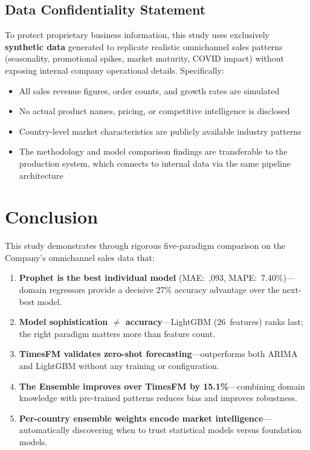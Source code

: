 \documentclass[10pt,twocolumn,a4paper]{article}
\begin{document}
\subsection{Data Confidentiality Statement}

To protect proprietary business information, this study uses exclusively \textbf{synthetic data} generated to replicate realistic omnichannel sales patterns (seasonality, promotional spikes, market maturity, COVID impact) without exposing internal company operational details. Specifically:
\begin{itemize}[leftmargin=*,noitemsep,topsep=2pt]
    \item All sales revenue figures, order counts, and growth rates are simulated
    \item No actual product names, pricing, or competitive intelligence is disclosed
    \item Country-level market characteristics are publicly available industry patterns
    \item The methodology and model comparison findings are transferable to the production system, which connects to internal data via the same pipeline architecture
\end{itemize}

\section{Conclusion}
\label{sec:conclusion}

This study demonstrates through rigorous five-paradigm comparison on the Company's omnichannel sales data that:

\begin{enumerate}[leftmargin=*,noitemsep,topsep=2pt]
    \item \textbf{Prophet is the best individual model} (MAE:~,093, MAPE:~7.40\%)---domain regressors provide a decisive 27\% accuracy advantage over the next-best model.
    \item \textbf{Model sophistication $\neq$ accuracy}---LightGBM (26~features) ranks last; the right paradigm matters more than feature count.
    \item \textbf{TimesFM validates zero-shot forecasting}---outperforms both ARIMA and LightGBM without any training or configuration.
    \item \textbf{The Ensemble improves over TimesFM by 15.1\%}---combining domain knowledge with pre-trained patterns reduces bias and improves robustness.
    \item \textbf{Per-country ensemble weights encode market intelligence}---automatically discovering when to trust statistical models versus foundation models.
\end{enumerate}
\end{document}
